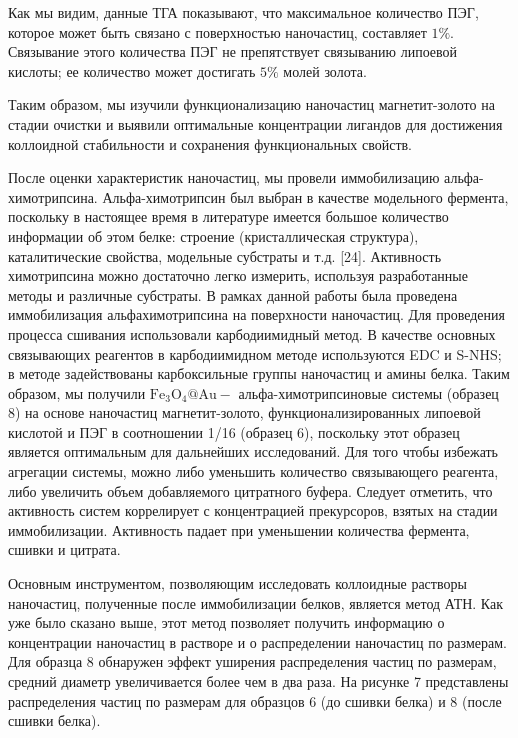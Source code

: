 \documentclass[10pt, a4paper]{article}
\begin{document}
  Как мы видим, данные ТГА показывают, что максимальное количество ПЭГ, которое может быть связано с поверхностью наночастиц, составляет \(1 \%\). Связывание этого количества ПЭГ не препятствует связыванию липоевой кислоты; ее количество может достигать \(5 \%\) молей золота.
  
  Таким образом, мы изучили функционализацию наночастиц магнетит-золото на стадии очистки и выявили оптимальные концентрации лигандов для достижения коллоидной стабильности и сохранения функциональных свойств.
  
  После оценки характеристик наночастиц, мы провели иммобилизацию альфа-химотрипсина. Альфа-химотрипсин был выбран в качестве модельного фермента, поскольку в настоящее время в литературе имеется большое количество информации об этом белке: строение (кристаллическая структура), каталитические свойства, модельные субстраты и т.д. [24]. Активность химотрипсина можно достаточно легко измерить, используя разработанные методы и различные субстраты. В рамках данной работы была проведена иммобилизация альфахимотрипсина на поверхности наночастиц. Для проведения процесса сшивания использовали карбодиимидный метод. В качестве основных связывающих реагентов в карбодиимидном методе используются EDC и S-NHS; в методе задействованы карбоксильные группы наночастиц и амины белка. Таким образом, мы получили \(\mathrm{Fe}_{3} \mathrm{O}_{4} @ \mathrm{Au}-\) альфа-химотрипсиновые системы (образец 8) на основе наночастиц магнетит-золото, функционализированных липоевой кислотой и ПЭГ в соотношении 1/16 (образец 6), поскольку этот образец является оптимальным для дальнейших исследований. Для того чтобы избежать агрегации системы, можно либо уменьшить количество связывающего реагента, либо увеличить объем добавляемого цитратного буфера. Следует отметить, что активность систем коррелирует с концентрацией прекурсоров, взятых на стадии иммобилизации. Активность падает при уменьшении количества фермента, сшивки и цитрата.
  
  Основным инструментом, позволяющим исследовать коллоидные растворы наночастиц, полученные после иммобилизации белков, является метод АТН. Как уже было сказано выше, этот метод позволяет получить информацию о концентрации наночастиц в растворе и о распределении наночастиц по размерам. Для образца 8 обнаружен эффект уширения распределения частиц по размерам, средний диаметр увеличивается более чем в два раза. На рисунке 7 представлены распределения частиц по размерам для образцов 6 (до сшивки белка) и 8 (после сшивки белка).
  
\end{document}
